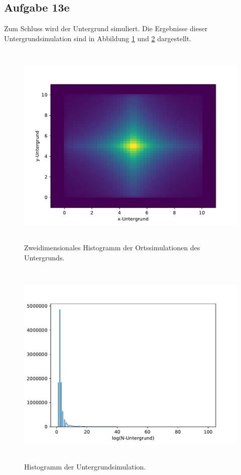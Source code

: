     \subsection{Aufgabe 13e}
    Zum Schluss wird der Untergrund simuliert.
    Die Ergebnisse dieser Untergrundsimulation sind in Abbildung \ref{fig:detektoruntergrund} und
    \ref{fig:histuntergrund} dargestellt.
    \begin{figure}[H]
      \centering
      \includegraphics[height=10cm]{detektoruntergrund.pdf}
      \caption{Zweidimensionales Histogramm der Ortssimulationen des Untergrunds.}
      \label{fig:detektoruntergrund}
    \end{figure}
    \begin{figure}[H]
      \centering
      \includegraphics[height=10cm]{histuntergrund.pdf}
      \caption{Histogramm der Untergrundsimulation.}
      \label{fig:histuntergrund}
    \end{figure}






